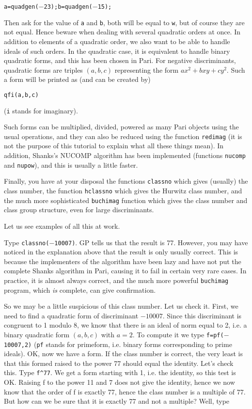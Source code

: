 \centerline{\tt a=quadgen($-$23);b=quadgen($-$15);}

Then ask for the value of {\tt a} and {\tt b}, both will be equal to {\tt w},
but of course they are not equal. Hence beware when dealing with several 
quadratic orders at once. 
\smallskip
In addition to elements of a quadratic order, we also want to be able to handle
ideals of such orders. In the quadratic case, it is equivalent to handle
binary quadratic forms, and this has been chosen in Pari. For negative
discriminants, quadratic forms are triples $(a,b,c)$ representing the form
$ax^2+bxy+cy^2$. Such a form will be printed as (and can be created by)

\centerline{\tt qfi(a,b,c)}

({\tt i} stands for imaginary).

Such forms can be multiplied, divided, powered as many Pari objects using
the usual operations, and they can also be reduced using the function
{\tt redimag} (it is not the purpose of this tutorial to explain what all these
things mean). In addition, Shanks's NUCOMP algorithm has been implemented
(functions {\tt nucomp} and {\tt nupow}), and this is usually a little faster.

Finally, you have at your disposal the functions {\tt classno} which gives 
(usually) the class number, the function {\tt hclassno} which gives the
Hurwitz class number, and the much more sophisticated {\tt buchimag} function
which gives the class number and class group structure, even for large 
discriminants.

Let us see examples of all this at work.

Type {\tt classno($-$10007)}. GP tells us that the result is 77. However, you may
have noticed in the explanation above that the result is only usually correct.
This is because the implementers of the algorithm have been lazy and have not
put the complete Shanks algorithm in Pari, causing it to fail in certain very
rare cases. In practice, it is almost always correct, and the much more 
powerful {\tt buchimag} program, which {\it is} complete, can give
confirmation.

So we may be a little suspicious of this class number. Let us check it.
First, we need to find a quadratic form of discriminant $-10007$. Since this
discriminant is congruent to 1 modulo 8, we know that there is an ideal of 
norm equal to 2, i.e. a binary quadratic form $(a,b,c)$ with $a=2$. To compute it
we type {\tt f=pf($-$10007,2)} ({\tt pf} stands for primeform, i.e. binary forms
corresponding to prime ideals). OK, now we have a form. If the class
number is correct, the very least is that this formed raised to the
power 77 should equal the identity. Let's check this.
Type {\tt f\^{}77}. We get a form starting
with 1, i.e. the identity, so this test is OK. Raising f to the power 11 and 7
does not give the identity, hence we now know that the order of f is exactly
77, hence the class number is a multiple of 77. But how can we be sure that
it is exactly 77 and not a multiple? Well, type

